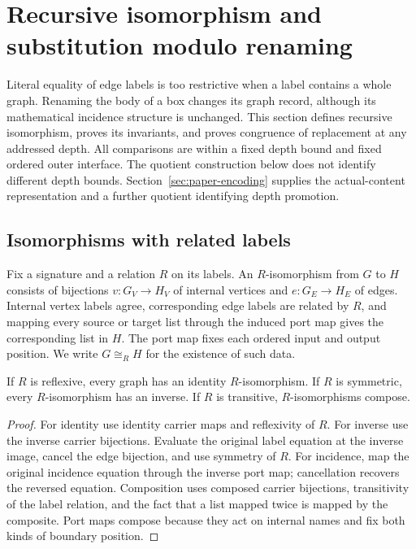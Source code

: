 \section{Recursive isomorphism and substitution modulo renaming}
\label{sec:recursive-isomorphism}

Literal equality of edge labels is too restrictive when a label contains a
whole graph. Renaming the body of a box changes its graph record, although its
mathematical incidence structure is unchanged. This section defines recursive
isomorphism, proves its invariants, and proves congruence of replacement at any
addressed depth. All comparisons are within a fixed depth bound and fixed
ordered outer interface. The quotient construction below does not identify
different depth bounds. Section~\ref{sec:paper-encoding} supplies the
actual-content representation and a further quotient identifying depth promotion.

\subsection{Isomorphisms with related labels}

\begin{definition}\label{term:relational-isomorphism}
Fix a signature and a relation $R$ on its labels. An $R$-isomorphism from $G$ to
$H$ consists of bijections $v:G_V\to H_V$ of internal vertices and
$e:G_E\to H_E$ of edges. Internal vertex labels agree, corresponding edge labels
are related by $R$, and mapping every source or target list through the induced
port map gives the corresponding list in $H$. The port map fixes each ordered
input and output position. We write $G\cong_R H$ for the existence of such data.
\end{definition}

\begin{lemma}
If $R$ is reflexive, every graph has an identity $R$-isomorphism. If $R$ is
symmetric, every $R$-isomorphism has an inverse. If $R$ is transitive,
$R$-isomorphisms compose.
\end{lemma}
\begin{proof}
For identity use identity carrier maps and reflexivity of $R$. For inverse use
the inverse carrier bijections. Evaluate the original label equation at the
inverse image, cancel the edge bijection, and use symmetry of $R$. For incidence,
map the original incidence equation through the inverse port map; cancellation
recovers the reversed equation. Composition uses composed carrier bijections,
transitivity of the label relation, and the fact that a list mapped twice is
mapped by the composite. Port maps compose because they act on internal names
and fix both kinds of boundary position.
\end{proof}

